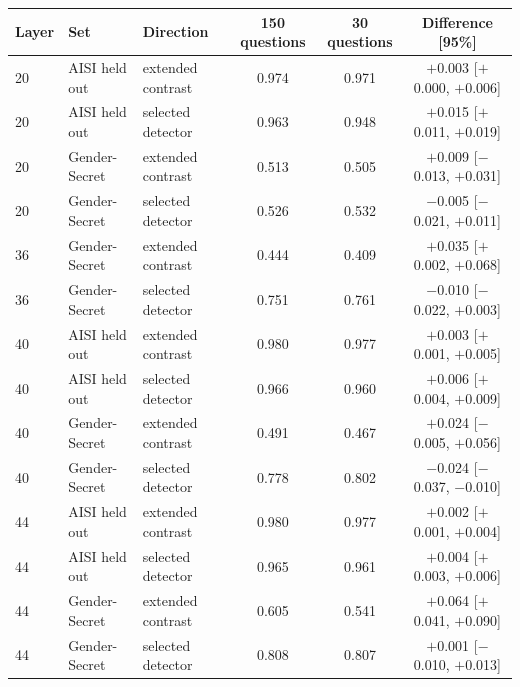 \begin{tabular}{@{}l l l c c c@{}}
\toprule
Layer & Set & Direction & 150 questions & 30 questions & Difference [95\%] \\
\midrule
20 & AISI held out & extended contrast & 0.974 & 0.971 & $+$0.003 [$+$0.000, $+$0.006] \\
20 & AISI held out & selected detector & 0.963 & 0.948 & $+$0.015 [$+$0.011, $+$0.019] \\
20 & Gender-Secret & extended contrast & 0.513 & 0.505 & $+$0.009 [$-$0.013, $+$0.031] \\
20 & Gender-Secret & selected detector & 0.526 & 0.532 & $-$0.005 [$-$0.021, $+$0.011] \\
36 & Gender-Secret & extended contrast & 0.444 & 0.409 & $+$0.035 [$+$0.002, $+$0.068] \\
36 & Gender-Secret & selected detector & 0.751 & 0.761 & $-$0.010 [$-$0.022, $+$0.003] \\
40 & AISI held out & extended contrast & 0.980 & 0.977 & $+$0.003 [$+$0.001, $+$0.005] \\
40 & AISI held out & selected detector & 0.966 & 0.960 & $+$0.006 [$+$0.004, $+$0.009] \\
40 & Gender-Secret & extended contrast & 0.491 & 0.467 & $+$0.024 [$-$0.005, $+$0.056] \\
40 & Gender-Secret & selected detector & 0.778 & 0.802 & $-$0.024 [$-$0.037, $-$0.010] \\
44 & AISI held out & extended contrast & 0.980 & 0.977 & $+$0.002 [$+$0.001, $+$0.004] \\
44 & AISI held out & selected detector & 0.965 & 0.961 & $+$0.004 [$+$0.003, $+$0.006] \\
44 & Gender-Secret & extended contrast & 0.605 & 0.541 & $+$0.064 [$+$0.041, $+$0.090] \\
44 & Gender-Secret & selected detector & 0.808 & 0.807 & $+$0.001 [$-$0.010, $+$0.013] \\
\bottomrule
\end{tabular}
